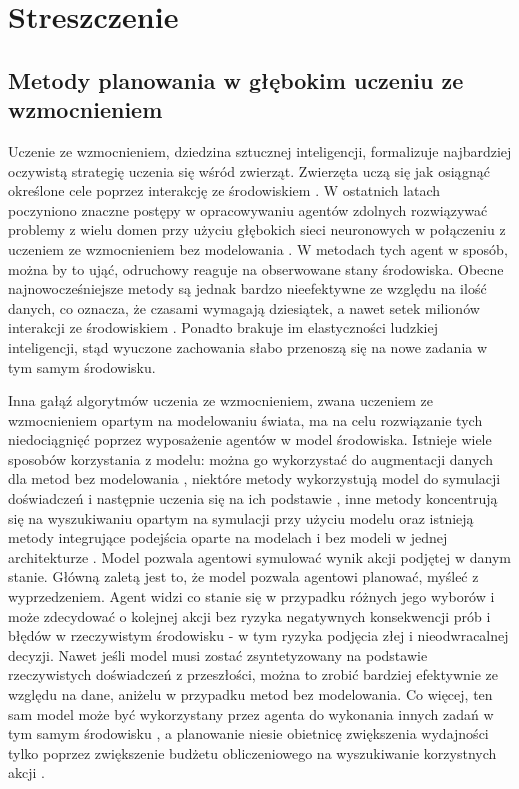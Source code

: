 \section*{Streszczenie}
\subsection*{Metody planowania w głębokim uczeniu ze wzmocnieniem}

Uczenie ze wzmocnieniem, dziedzina sztucznej inteligencji, formalizuje najbardziej oczywistą strategię uczenia się wśród zwierząt. Zwierzęta uczą się jak osiągnąć określone cele poprzez interakcję ze środowiskiem \cite{Book.RLAI}. W ostatnich latach poczyniono znaczne postępy w opracowywaniu agentów zdolnych rozwiązywać problemy z wielu domen przy użyciu głębokich sieci neuronowych w połączeniu z uczeniem ze wzmocnieniem bez modelowania \cite{Algo.Rainbow}\cite{Algo.A3C}\cite{Algo.PPO}. W metodach tych agent w sposób, można by to ująć, odruchowy reaguje na obserwowane stany środowiska. Obecne najnowocześniejsze metody są jednak bardzo nieefektywne ze względu na ilość danych, co oznacza, że ​​czasami wymagają dziesiątek, a nawet setek milionów interakcji ze środowiskiem \cite{Benchmark.RevisitingALE}. Ponadto brakuje im elastyczności ludzkiej inteligencji, stąd wyuczone zachowania słabo przenoszą się na nowe zadania w tym samym środowisku.

Inna gałąź algorytmów uczenia ze wzmocnieniem, zwana uczeniem ze wzmocnieniem opartym na modelowaniu świata, ma na celu rozwiązanie tych niedociągnięć poprzez wyposażenie agentów w model środowiska. Istnieje wiele sposobów korzystania z modelu: można go wykorzystać do augmentacji danych dla metod bez modelowania \cite{Algo.MBVE}, niektóre metody wykorzystują model do symulacji doświadczeń i następnie uczenia się na ich podstawie \cite{Algo.WorldModels}, inne metody koncentrują się na wyszukiwaniu opartym na symulacji przy użyciu modelu \cite{Algo.AlphaZero} oraz istnieją metody integrujące podejścia oparte na modelach i bez modeli w jednej architekturze \cite{Algo.I2A}. Model pozwala agentowi symulować wynik akcji podjętej w danym stanie. Główną zaletą jest to, że model pozwala agentowi planować, myśleć z wyprzedzeniem. Agent widzi co stanie się w przypadku różnych jego wyborów i może zdecydować o kolejnej akcji bez ryzyka negatywnych konsekwencji prób i błędów w rzeczywistym środowisku - w tym ryzyka podjęcia złej i nieodwracalnej decyzji. Nawet jeśli model musi zostać zsyntetyzowany na podstawie rzeczywistych doświadczeń z przeszłości, można to zrobić bardziej efektywnie ze względu na dane, aniżelu w przypadku metod bez modelowania. Co więcej, ten sam model może być wykorzystany przez agenta do wykonania innych zadań w tym samym środowisku \cite{Algo.I2A}, a planowanie niesie obietnicę zwiększenia wydajności tylko poprzez zwiększenie budżetu obliczeniowego na wyszukiwanie korzystnych akcji \cite{Algo.AlphaGoZero}.

